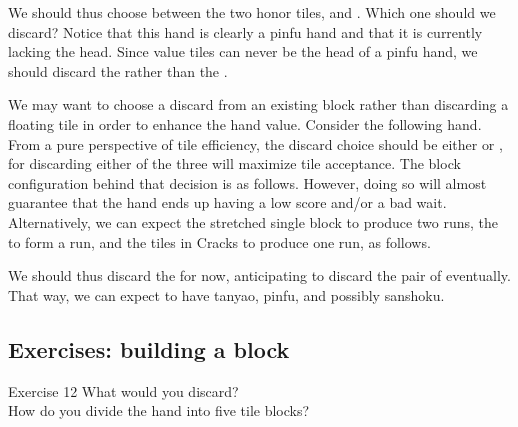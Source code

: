 \bigskip
We should thus choose between the two honor tiles, {\large\zhong} and {\large\bei}. Which one should we discard? Notice that this hand is clearly a {\jap pinfu} hand and that it is currently lacking the head. Since value tiles can never be the head of a {\jap pinfu} hand, we should discard the {\large\zhong} rather than the {\large\bei}. 

We may want to choose a discard from an existing block rather than discarding a floating tile in order to enhance the hand value. Consider the following hand. 
\bp
{}
\ep
From a pure perspective of tile efficiency, the discard choice should be either {\large{} } or {\large{}}, for discarding either of the three will maximize tile acceptance. The block configuration behind that decision is as follows. 
\emj
However, doing so will almost guarantee that the hand ends up having a low score and/or a bad wait. Alternatively, we can expect the stretched single block {\large{}} to produce two runs, the {\large{}} to form a run, and the tiles in Cracks to produce one run, as follows. 

\emj
We should thus discard the {\large{}} for now, anticipating to discard the pair of {\large{}} eventually. That way, we can expect to have {\jap tanyao}, {\jap pinfu}, and possibly {\jap sanshoku}. 

\vfill

\subsection*{Exercises: building a block}

\bigskip

\bigskip

\begin{itembox}[l]{Exercise 12}
What would you discard? \\
\vsp
How do you divide the hand into five tile blocks? 

\vspace{-30pt}
\bp
{}\\ \vspace{-18pt}
\rfw{}
\ep
\end{itembox}

